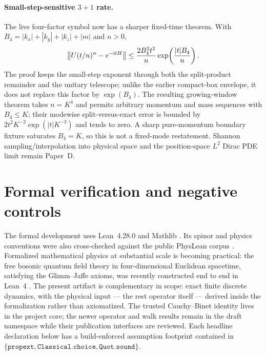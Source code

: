 \documentclass[11pt]{article}
\newcommand{\ii}{\mathrm{i}}
\begin{document}
\paragraph{Small-step-sensitive $3+1$ rate.}
The live four-factor symbol now has a sharper fixed-time theorem.  With
$B_4=|k_x|+|k_y|+|k_z|+|m|$ and $n>0$,
\[
 \left\|U(t/n)^n-e^{-\ii tH}\right\|
 \leq {2B_4^2t^2\over n}\exp\!\left({|t|B_4\over n}\right).
\]
The proof keeps the small-step exponent through both the split-product
remainder and the unitary telescope; unlike the earlier compact-box envelope,
it does not replace this factor by $\exp(B_4)$.  The resulting growing-window
theorem takes $n=K^4$ and permits arbitrary momentum and mass sequences with
$B_4\leq K$; their modewise split-versus-exact error is bounded by
$2t^2K^{-2}\exp(|t|K^{-3})$ and tends to zero.  A sharp pure-momentum boundary
fixture saturates $B_4=K$, so this is not a fixed-mode restatement.  Shannon
sampling/interpolation into physical space and the position-space $L^2$ Dirac
PDE limit remain Paper~D.

\section{Formal verification and negative controls}

The formal development uses Lean~4.28.0 and Mathlib \cite{Lean4,Mathlib}.  Its
spinor and physics conventions were also cross-checked against the public
PhysLean corpus \cite{PhysLean}.  Formalized mathematical physics at
substantial scale is becoming practical: the free bosonic quantum field
theory in four-dimensional Euclidean spacetime, satisfying the Glimm--Jaffe
axioms, was recently constructed end to end in Lean~4
\cite{DouglasQFTLean}.  The present artifact is complementary in scope:
exact finite discrete dynamics, with the physical input --- the rest
operator itself --- derived inside the formalization rather than
axiomatized.  The trusted
Cauchy--Binet identity lives in the project core; the newer operator and walk
results remain in the draft namespace while their publication interfaces are
reviewed.  Each headline declaration below has a build-enforced assumption
footprint contained in
$\{\mathtt{propext},\mathtt{Classical.choice},\mathtt{Quot.sound}\}$.
\end{document}
